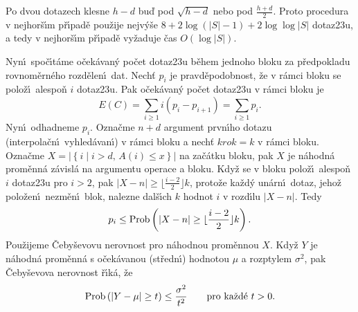 \flushpar Po dvou dotazech klesne $h-d$ bu\v d pod $\sqrt {h-d}$ nebo pod 
$\frac {h+d}2$. Proto procedura v nejhor\v s\'\i m p\v r\'\i pad\v e pou\v zije 
nejv\'y\v se $8+2\log\left(|S|-1\right)+2\log\log|S|$ dotaz\accent23u, a tedy v nejhor\v s\'\i m 
p\v r\'\i pad\v e vy\v zaduje \v cas $O\left(\log|S|\right)$.
\medskip

\flushpar Nyn\'\i\ spo\v c\'\i t\'ame o\v cek\'avan\'y po\v cet dotaz\accent23u 
b\v ehem jednoho bloku za p\v redpokladu rovnom\v er\-n\'eho rozd\v elen\'\i\ dat. Nech\v t $p_i$ je prav\-d\v e\-podobnost, \v ze 
v r\'amci bloku se polo\v z\'\i\ ales\-po\v n $i$ dotaz\accent23u. Pak 
o\v cek\'avan\'y po\v cet dotaz\accent23u v r\'amci bloku je 
$$E\left(C\right)=\sum_{i\ge 1}i\left(p_i-p_{i+1}\right)=\sum_{i\ge 1}p_i.$$
Nyn\'\i\ odhadneme $p_i$.  Ozna\v cme $n+d$ argument prvn\'\i ho dotazu 
(interpola\v cn\'\i\ vyhled\'avan\'\i ) v r\'amci bloku a nech\v t $
krok=k$ 
v r\'amci bloku.  Ozna\v cme $X=|\left\{i\mid i>d,\,A\left(i\right)\le x\right\}|$ na 
za\v c\'atku bloku, pak $X$ je n\'ahodn\'a prom\v enn\'a z\'avisl\'a na 
argumentu ope\-race a bloku.  Kdy\v z se v bloku polo\v z\'\i\ 
alespo\v n $i$ dotaz\accent23u pro $i>2$, pak $|X-n|\ge\lfloor\frac {
i-2}2\rfloor k$, 
proto\v ze ka\v zd\'y un\'arn\'\i\ dotaz, jeho\v z polo\v zen\'\i\  
nezm\v en\'\i\ blok, nalezne dal\v s\'\i ch $k$ hodnot $i$ v rozd\'\i lu $|X-n|$. 
Tedy 
$$p_i\le\operatorname{Prob}\left(|X-n|\ge\lfloor\frac {i-2}2\rfloor k\right).$$
Pou\v zijeme \v Ceby\v sevovu nerovnost pro n\'ahodnou 
prom\v en\-nou $X$. Kdy\v z $Y$ je n\'ahodn\'a prom\v enn\'a s o\v cek\'avanou 
(st\v redn\'\i ) hodnotou $\mu$ a rozptylem $\sigma^2$, pak \v Ceby\v sevova 
nerovnost \v r\'\i k\'a, \v ze 
$$\Prob\left(|Y-\mu |\ge t\right)\le\frac {\sigma^2}{t^2}\qquad\text{\rm pro ka\v zd\'e }
t>0.$$
\medskip

